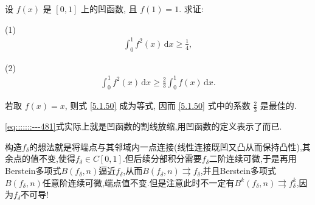 \documentclass[../../main.tex]{subfiles}
\begin{document}
\begin{example}
设 \( f(x) \) 是 \([0,1]\) 上的凹函数, 且 \( f(1) = 1 \). 求证:

(1)\begin{align}
\int_{0}^{1} f^2(x) \, \mathrm{d}x \geqslant \frac{1}{4}, \label{5.1.49}
\end{align}

(2)\begin{align}
\int_{0}^{1} f^2(x) \, \mathrm{d}x \geqslant \frac{2}{3} \int_{0}^{1} f(x) \, \mathrm{d}x. \label{5.1.50}
\end{align}
\end{example}
\begin{remark}
若取 \( f(x) = x \), 则式 \eqref{5.1.50} 成为等式, 因而 \eqref{5.1.50} 式中的系数 \( \frac{2}{3} \) 是最佳的.
\end{remark}
\begin{remark}
\eqref{eq:::::::---481}式实际上就是凹函数的割线放缩,用凹函数的定义表示了而已.
\end{remark}
\begin{note}
构造$f_\delta$的想法就是将端点与其邻域内一点连接(线性连接既凹又凸从而保持凸性),其余点的值不变,使得$f_\delta\in C[0,1]$.但后续分部积分需要$f_\delta$二阶连续可微,于是再用Berstein多项式$B(f_\delta,n)$逼近$f_\delta$,从而$B(f_{\delta},n)\rightrightarrows f_{\delta}$,并且Berstein多项式$B(f_\delta,n)$任意阶连续可微,端点值不变.但是注意此时不一定有$B^k(f_{\delta},n)\rightrightarrows f_{\delta}^{k}$,因为$f_\delta$不可导!
\end{note}
\end{document}

